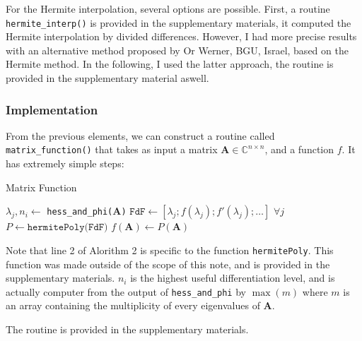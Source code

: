 \documentclass[11pt]{article}
\numberwithin{equation}{section}
\begin{document}
For the Hermite interpolation, several options are possible. First, a routine \texttt{hermite\_interp()} is provided in the supplementary materials, it computed the Hermite interpolation by divided differences. However, I had more precise results with an alternative method proposed by Or Werner, BGU, Israel, based on the Hermite method. In the following, I used the latter approach, the routine is provided in the supplementary material aswell.
\subsubsection{Implementation}
From the previous elements, we can construct a routine called \texttt{matrix\_function()} that takes as input a matrix $\mathbf{A}\in\mathbb{C}^{n\times n}$, and a function $f$. It has extremely simple steps:

\begin{algorithm2e}
    \SetAlgoLined
    \caption{Matrix Function}
    $\lambda_j, n_i \gets$ \texttt{hess\_and\_phi($\mathbf{A}$)}\;
    $\texttt{FdF} \gets [\lambda_j;f(\lambda_j);f'(\lambda_j);\dots]$ $\forall j$\;
    $P \gets \texttt{hermitePoly(FdF)}$\;
    $f(\mathbf{A}) \gets P(\mathbf{A})$

\end{algorithm2e}

Note that line 2 of Alorithm 2 is specific to the function \texttt{hermitePoly}. This function was made outside of the scope of this note, and is provided in the supplementary materials. $n_i$ is the highest useful differentiation level, and is actually computer from the output of \texttt{hess\_and\_phi} by $\max(m)$ where $m$ is an array containing the multiplicity of every eigenvalues of $\mathbf{A}$.

The routine is provided in the supplementary materials.
\end{document}
